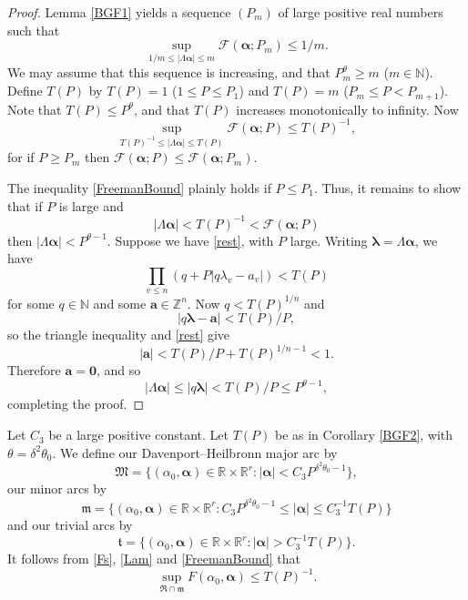 \documentclass[12pt,reqno]{amsart}
\theoremstyle{definition}
\theoremstyle{remark}
\numberwithin{equation}{section}
\begin{document}
\begin{proof} Lemma \ref{BGF1} yields a sequence $(P_m)$ of large positive real numbers such that
\[
\sup_{1/m {\leqslant} |{{\Lambda}} {\boldsymbol{{\alpha}}}| {\leqslant} m} {\mathcal F}({\boldsymbol{{\alpha}}}; P_m) {\leqslant} 1/m.
\]
We may assume that this sequence is increasing, and that $P_m^{{\theta}} {\geqslant} m$ ($m \in {\mathbb N}$). Define $T(P)$ by $T(P) = 1$ ($1 {\leqslant} P {\leqslant} P_1$) and $T(P) = m$ ($P_m {\leqslant} P < P_{m+1}$). Note that $T(P) {\leqslant} P^{{\theta}}$, and that $T(P)$ increases monotonically to infinity. Now
\[
\sup_{T(P)^{-1} {\leqslant} |{{\Lambda}} {\boldsymbol{{\alpha}}}| {\leqslant} T(P)} {\mathcal F}({\boldsymbol{{\alpha}}}; P) {\leqslant} T(P)^{-1},
\]
for if $P {\geqslant} P_m$ then ${\mathcal F}({\boldsymbol{{\alpha}}}; P) {\leqslant} {\mathcal F}({\boldsymbol{{\alpha}}}; P_m)$.

The inequality \eqref{FreemanBound} plainly holds if $P {\leqslant} P_1$. Thus, it remains to show that if $P$ is large and
\begin{equation} \label{rest}
|{{\Lambda}} {\boldsymbol{{\alpha}}}| < T(P)^{-1} < {\mathcal F}({\boldsymbol{{\alpha}}}; P)
\end{equation}
then $|{{\Lambda}} {\boldsymbol{{\alpha}}}| < P^{{{\theta}} - 1}$. Suppose we have \eqref{rest}, with $P$ large. Writing ${{\boldsymbol {{\lambda}}}} = {{\Lambda}} {\boldsymbol{{\alpha}}}$, we have
\[
\prod_{v {\leqslant} n} (q + P|q {{\lambda}}_v - a_v|) < T(P)
\]
for some $q \in {\mathbb N}$ and some ${\mathbf a} \in {\mathbb Z}^n$. Now $q < T(P)^{1/n}$ and
\[
|q {{\boldsymbol {{\lambda}}}} - {\mathbf a}| < T(P) / P,
\]
so the triangle inequality and \eqref{rest} give
\[
|{\mathbf a}| < T(P)/P + T(P)^{1/n - 1} < 1.
\]
Therefore ${\mathbf a} = {\mathbf 0}$, and so
\[
|{{\Lambda}} {\boldsymbol{{\alpha}}}| {\leqslant} |q {{\boldsymbol {{\lambda}}}}| < T(P) / P {\leqslant} P^{{{\theta}} - 1},
\]
completing the proof.
\end{proof}

Let $C_3$ be a large positive constant. Let $T(P)$ be as in Corollary \ref{BGF2}, with ${{\theta}} = {{\delta}}^2 {{\theta}}_0$. We define our Davenport--Heilbronn major arc by
\[
{\mathfrak M} = \{ ({{\alpha}}_0, {\boldsymbol{{\alpha}}}) \in {\mathbb R} \times {\mathbb R}^r: |{\boldsymbol{{\alpha}}}| < C_3 P^{{{\delta}}^2 {{\theta}}_0 - 1} \},
\]
our minor arcs by
\[
{\mathfrak m} = \{ ({{\alpha}}_0, {\boldsymbol{{\alpha}}}) \in {\mathbb R} \times {\mathbb R}^r: C_ 3 P^{{{\delta}}^2 {{\theta}}_0 - 1} {\leqslant} |{\boldsymbol{{\alpha}}}| {\leqslant} C_3^{-1} T(P) \}
\]
and our trivial arcs by
\[
{\mathfrak t} = \{ ({{\alpha}}_0, {\boldsymbol{{\alpha}}}) \in {\mathbb R} \times {\mathbb R}^r: |{\boldsymbol{{\alpha}}}| > C_3^{-1} T(P) \}.
\]
It follows from \eqref{Fs}, \eqref{Lam} and \eqref{FreemanBound} that
\begin{equation} \label{Freeman}
\sup_{{\mathfrak R} \cap {\mathfrak m}} F({{\alpha}}_0,{\boldsymbol{{\alpha}}}) {\leqslant} T(P)^{-1}.
\end{equation}
\end{document}
